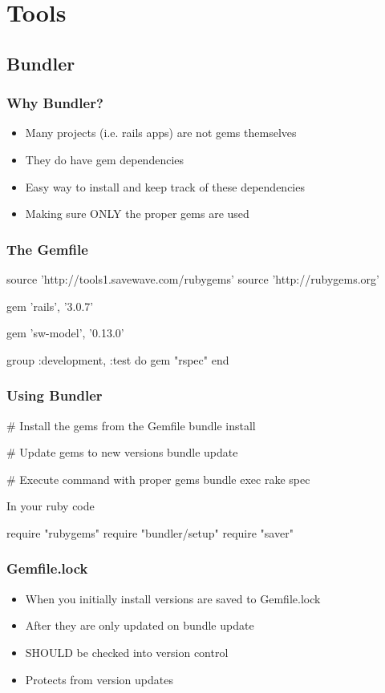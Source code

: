 \section{Tools}

\subsection{Bundler}

\begin{frame}
  \frametitle{Why Bundler?}
  \begin{itemize}
  \item Many projects (i.e. rails apps) are not gems themselves
  \item They do have gem dependencies
  \pause
  \item Easy way to install and keep track of these dependencies
  \pause
  \item Making sure ONLY the proper gems are used
  \end{itemize}
\end{frame}

\begin{frame}[fragile]
  \frametitle{The Gemfile}
  \begin{rubycode}
    source 'http://tools1.savewave.com/rubygems'
    source 'http://rubygems.org'

    gem 'rails', '3.0.7'

    gem 'sw-model', '0.13.0'

    group :development, :test do
      gem "rspec"
    end
  \end{rubycode}
\end{frame}

\begin{frame}[fragile]
  \frametitle{Using Bundler}
  \begin{console}
    # Install the gems from the Gemfile
    bundle install

    # Update gems to new versions
    bundle update

    # Execute command with proper gems
    bundle exec rake spec
  \end{console}
  In your ruby code
  \begin{rubycode}
    require "rubygems"
    require "bundler/setup"
    require "saver"
  \end{rubycode}
\end{frame}

\begin{frame}[fragile]
  \frametitle{Gemfile.lock}
  \begin{itemize}
  \item When you initially install versions are saved to Gemfile.lock
  \pause
  \item After they are only updated on bundle update
  \pause
  \item SHOULD be checked into version control
  \item Protects from version updates
  \end{itemize}
\end{frame}

